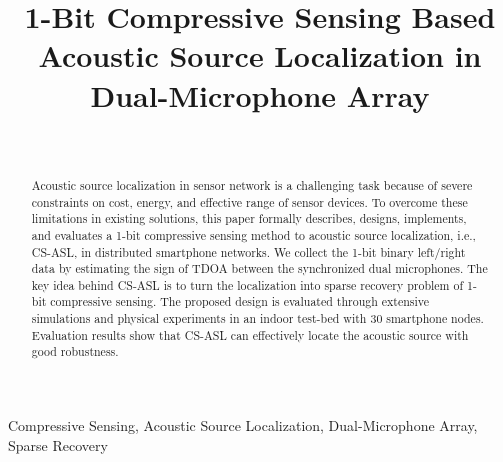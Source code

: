 \documentclass[journal]{IEEEtran}
\begin{document}
\title{1-Bit Compressive Sensing  Based Acoustic Source Localization  in  Dual-Microphone Array}

%
\author{\\
}

\maketitle

\thispagestyle{plain}
\pagestyle{plain}

\begin{abstract}
Acoustic source localization in sensor network is a challenging task because of severe constraints on cost, energy, and effective range of sensor devices.
To overcome these limitations in existing solutions, this paper formally describes, designs, implements, and evaluates a 1-bit compressive sensing method to acoustic source localization, i.e., CS-ASL, in distributed smartphone networks.
We  collect the 1-bit binary left/right data  by estimating the sign of TDOA between the synchronized dual microphones. 
The key idea behind CS-ASL is to turn the localization  into sparse recovery problem of 1-bit  compressive sensing. 
The proposed design is evaluated through extensive simulations and physical experiments in an indoor test-bed with 30 smartphone nodes. Evaluation results show that CS-ASL  can effectively locate the acoustic source with good robustness.



\end{abstract}

\begin{IEEEkeywords}
Compressive Sensing, Acoustic Source Localization,  Dual-Microphone Array, Sparse Recovery
\end{IEEEkeywords}



\IEEEpeerreviewmaketitle



%

%





\end{document}

